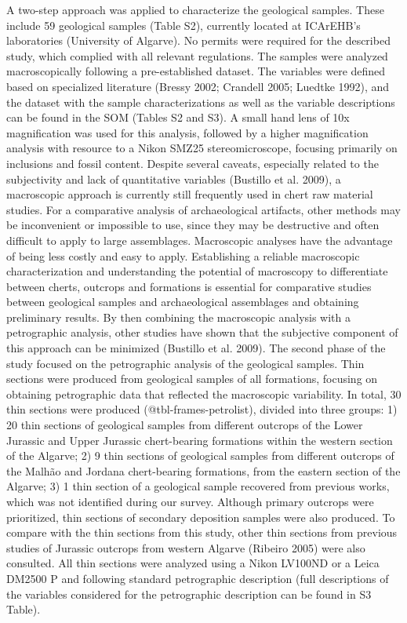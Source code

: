 \documentclass[
  a4paper,
  DIV=11,
  numbers=noendperiod]{scrreprt}
\begin{document}
A two-step approach was applied to characterize the geological samples.
These include 59 geological samples (Table S2), currently located at
ICArEHB's laboratories (University of Algarve). No permits were required
for the described study, which complied with all relevant regulations.
The samples were analyzed macroscopically following a pre-established
dataset. The variables were defined based on specialized literature
(Bressy 2002; Crandell 2005; Luedtke 1992), and the dataset with the
sample characterizations as well as the variable descriptions can be
found in the SOM (Tables S2 and S3). A small hand lens of 10x
magnification was used for this analysis, followed by a higher
magnification analysis with resource to a Nikon SMZ25 stereomicroscope,
focusing primarily on inclusions and fossil content. Despite several
caveats, especially related to the subjectivity and lack of quantitative
variables (Bustillo et al. 2009), a macroscopic approach is currently
still frequently used in chert raw material studies. For a comparative
analysis of archaeological artifacts, other methods may be inconvenient
or impossible to use, since they may be destructive and often difficult
to apply to large assemblages. Macroscopic analyses have the advantage
of being less costly and easy to apply. Establishing a reliable
macroscopic characterization and understanding the potential of
macroscopy to differentiate between cherts, outcrops and formations is
essential for comparative studies between geological samples and
archaeological assemblages and obtaining preliminary results. By then
combining the macroscopic analysis with a petrographic analysis, other
studies have shown that the subjective component of this approach can be
minimized (Bustillo et al. 2009). The second phase of the study focused
on the petrographic analysis of the geological samples. Thin sections
were produced from geological samples of all formations, focusing on
obtaining petrographic data that reflected the macroscopic variability.
In total, 30 thin sections were produced (@tbl-frames-petrolist),
divided into three groups: 1) 20 thin sections of geological samples
from different outcrops of the Lower Jurassic and Upper Jurassic
chert-bearing formations within the western section of the Algarve; 2) 9
thin sections of geological samples from different outcrops of the
Malhão and Jordana chert-bearing formations, from the eastern section of
the Algarve; 3) 1 thin section of a geological sample recovered from
previous works, which was not identified during our survey. Although
primary outcrops were prioritized, thin sections of secondary deposition
samples were also produced. To compare with the thin sections from this
study, other thin sections from previous studies of Jurassic outcrops
from western Algarve (Ribeiro 2005) were also consulted. All thin
sections were analyzed using a Nikon LV100ND or a Leica DM2500 P and
following standard petrographic description (full descriptions of the
variables considered for the petrographic description can be found in S3
Table).
\end{document}
